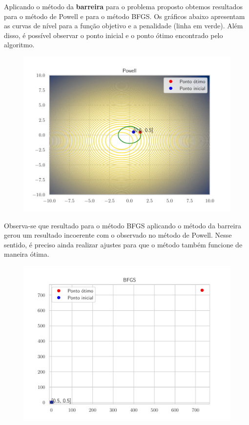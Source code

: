 \documentclass[12pt]{article}
\begin{document}
Aplicando o método da \textbf{barreira} para o problema proposto obtemos resultados para o método de Powell e para o método BFGS. Os gráficos abaixo apresentam as curvas de nível para a função objetivo e a penalidade (linha em verde). Além disso, é possível observar o ponto inicial e o ponto ótimo encontrado pelo algoritmo.

\begin{figure}[H]
  \centering
  \includegraphics[scale = 0.6]{problema_2_barreira_Powell_[0.5 0.5].pdf}
\end{figure}

Observa-se que resultado para o método BFGS aplicando o método da barreira gerou um resultado incoerente com o observado no método de Powell. Nesse sentido, é preciso ainda realizar ajustes para que o método também funcione de maneira ótima.

\begin{figure}[H]
  \centering
  \includegraphics[scale = 0.6]{problema_2_barreira_BFGS_[0.5 0.5].pdf}
\end{figure}
\end{document}
